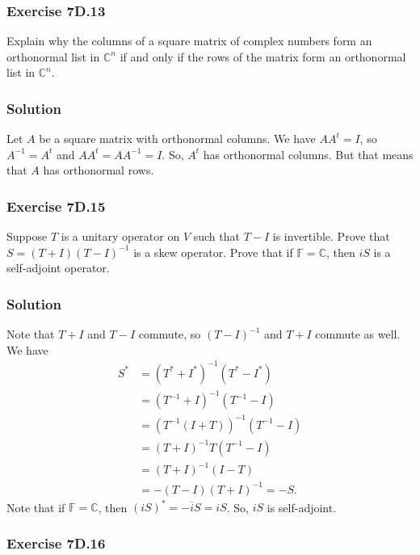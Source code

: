 \subsubsection*{Exercise 7D.13}

Explain why the columns of a square matrix of complex numbers form an orthonormal list in $\mathbb{C}^n$ if and only if the rows of the matrix form an orthonormal list in $\mathbb{C}^n$.

\subsubsection*{Solution}

Let $A$ be a square matrix with orthonormal columns.
We have $AA^t = I$, so $A^{-1} = A^t$ and $AA^t = AA^{-1} = I$.
So, $A^t$ has orthonormal columns.
But that means that $A$ has orthonormal rows.


\subsubsection*{Exercise 7D.15}

Suppose $T$ is a unitary operator on $V$ such that $T - I$ is invertible.
Prove that $S = (T + I)(T - I)^{-1}$ is a skew operator.
Prove that if $\mathbb{F} = \mathbb{C}$, then $iS$ is a self-adjoint operator.


\subsubsection*{Solution}

Note that $T + I$ and $T - I$ commute, so $(T - I)^{-1}$ and $T + I$ commute as well.
We have
\begin{equation*}
    \begin{split}
        S^* &= (T^* + I^*)^{-1}(T^* - I^*) \\
            &= (T^{-1} + I)^{-1}(T^{-1} - I) \\
            &= (T^{-1}(I + T))^{-1}(T^{-1} - I) \\
            &= (T + I)^{-1} T(T^{-1} - I) \\
            &= (T + I)^{-1} (I - T) \\
            &= - (T - I)(T + I)^{-1} = -S.
    \end{split}
\end{equation*}
Note that if $\mathbb{F} = \mathbb{C}$, then $(iS)^* = -\overline{i}S = iS$.
So, $iS$ is self-adjoint.


\subsubsection*{Exercise 7D.16}


